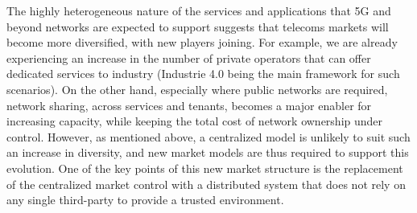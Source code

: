 The highly heterogeneous nature of the services and applications that 5G and beyond networks are expected to support suggests that telecoms markets will become more diversified, with new players joining. For example, we are already experiencing an increase in the number of private operators that can offer dedicated services to industry (Industrie 4.0 being the main framework for such scenarios).
On the other hand, especially where public networks are required, network sharing, across services and tenants, becomes a major enabler for increasing capacity, while keeping the total cost of network ownership under control\cite{6035827}.
However, as mentioned above, a centralized model is unlikely to suit such an increase in diversity, and new market models are thus required to support this evolution.
One of the key points of this new market structure is the replacement of the centralized market control with a distributed system that does not rely on any single third-party to provide a trusted environment.

